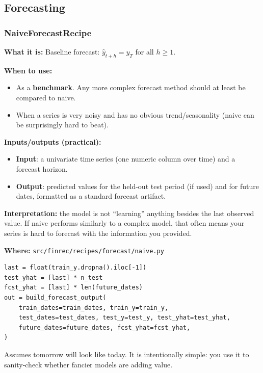 \documentclass[11pt,a4paper]{article}
\begin{document}
\subsection{Forecasting}

\subsubsection{NaiveForecastRecipe}\label{sec:naive}

\textbf{What it is:} Baseline forecast: $\hat{y}_{t+h} = y_T$ for all $h \geq 1$.

\textbf{When to use:}
\begin{itemize}[leftmargin=2em]
  \item As a \textbf{benchmark}. Any more complex forecast method should at least be compared to naive.
  \item When a series is very noisy and has no obvious trend/seasonality (naive can be surprisingly hard to beat).
\end{itemize}

\textbf{Inputs/outputs (practical):}
\begin{itemize}[leftmargin=2em]
  \item \textbf{Input}: a univariate time series (one numeric column over time) and a forecast horizon.
  \item \textbf{Output}: predicted values for the held-out test period (if used) and for future dates, formatted as a standard forecast artifact.
\end{itemize}

\textbf{Interpretation:} the model is not ``learning'' anything besides the last observed value. If naive performs similarly to a complex model, that often means your series is hard to forecast with the information you provided.

\textbf{Where:} \texttt{src/finrec/recipes/forecast/naive.py}

\begin{lstlisting}
last = float(train_y.dropna().iloc[-1])
test_yhat = [last] * n_test
fcst_yhat = [last] * len(future_dates)
out = build_forecast_output(
    train_dates=train_dates, train_y=train_y,
    test_dates=test_dates, test_y=test_y, test_yhat=test_yhat,
    future_dates=future_dates, fcst_yhat=fcst_yhat,
)
\end{lstlisting}

\begin{intuitionbox}
Assumes tomorrow will look like today. It is intentionally simple: you use it to sanity-check whether fancier models are adding value.
\end{intuitionbox}
\end{document}
